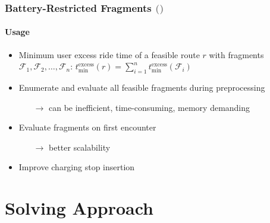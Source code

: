 \documentclass[aspectratio=1610]{beamer}
\let\oldfootnotesize\footnotesize
\renewcommand*{\footnotesize}{\oldfootnotesize\fontsize{6}{4}\selectfont}
\renewcommand{\footnotesize}{\scriptsize}
\begin{document}
\begin{frame}
  \frametitle{Battery-Restricted Fragments {\footnotesize{\textcolor{gray}{(\cite{Su:2023})}}}}
  \framesubtitle{Usage}
  
\begin{itemize}
	\item Minimum user excess ride time of a feasible route $r$ with fragments $\mathcal{F}_1, \mathcal{F}_2, \dots, \mathcal{F}_n$: $t^{\mathrm{excess}}_{\mathrm{min}}(r) = \sum_{i = 1}^{n} t^{\mathrm{excess}}_{\mathrm{min}}(\mathcal{F}_i)$ 
\end{itemize}

\medskip
  
\begin{itemize}
	\item Enumerate and evaluate all feasible fragments during preprocessing 
		\begin{itemize}
			\item[$\rightarrow$] can be inefficient, time-consuming, memory demanding 
		\end{itemize}
\end{itemize}

\medskip

\begin{itemize}
	\item Evaluate fragments on first encounter 
		\begin{itemize}
			\item[$\rightarrow$] better scalability 
		\end{itemize}
	\item Improve charging stop insertion %
\end{itemize}

\end{frame}


\section{Solving Approach}

\end{document}
